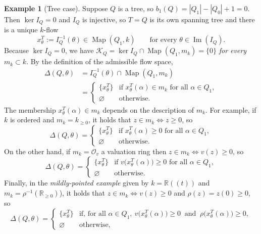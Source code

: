 \documentclass[12pt]{amsart}
\theoremstyle{plain}
\theoremstyle{definition}
\newtheorem{example}[theorem]{Example}
\DeclareMathOperator{\map}{Map}
\begin{document}
\begin{example}[Tree case]\label{tree}
Suppose $Q$ is a tree, so $b_1(Q) = |Q_1| - |Q_0| + 1 = 0$. Then $\ker I_Q = 0$
and $I_Q$ is injective, so $T = Q$ is its own spanning tree and there is a unique
$k$-flow
\[
  x^T_\theta := I_Q^{-1}(\theta) \in \map(Q_1, k)
  \qquad\text{for every } \theta \in \operatorname{Im}(I_Q).
\]
Because $\ker I_Q = 0$, we have $\mathcal{K}_Q = \ker I_Q \cap \map(Q_1,m_k) = \{0\}$
\emph{for every} $m_k \subset k$. By the definition of the admissible flow space,
\begin{align*}
  \Delta(Q,\theta)
  &= I_Q^{-1}(\theta) \cap \map(Q_1, m_k)
  \\
  & =
  \begin{cases}
    \{x^T_\theta\} & \text{if } x^T_\theta(\alpha) \in m_k \text{ for all } \alpha \in Q_1,\\[2pt]
    \varnothing    & \text{otherwise.}
  \end{cases}
\end{align*}
The membership $x^T_\theta(\alpha) \in m_k$ depends on the description of
$m_k$. For example,  if $k$ is ordered and $m_k = k_{\geq 0}$, it holds that $z \in m_k
    \iff z \geq 0$, so
    \[
      \Delta(Q,\theta) =
      \begin{cases}
        \{x^T_\theta\} & \text{if } x^T_\theta(\alpha) \geq 0 \text{ for all } \alpha \in Q_1,\\
        \varnothing    & \text{otherwise.}
      \end{cases}
    \]
On the other hand, if $m_k = \mathcal{O}_v$ a valuation ring then
    $z \in m_k \iff v(z) \geq 0$, so
    \[
      \Delta(Q,\theta) =
      \begin{cases}
        \{x^T_\theta\} & \text{if } v\big(x^T_\theta(\alpha)\big) \geq 0 \text{ for all } \alpha \in Q_1,\\
        \varnothing    & \text{otherwise.}
      \end{cases}
    \]
Finally, in the \emph{mildly-pointed example} given by $k = \mathbb{R}((t))$ and
$m_k = \rho^{-1}(\mathbb{R}_{\geq 0})$), it holds that $z \in m_k \iff v(z) \geq 0$ and $\rho(z) = z(0) \geq 0$, so
    \[
      \Delta(Q,\theta) =
      \begin{cases}
        \{x^T_\theta\} & \text{if, for all } \alpha \in Q_1,\
        v\big(x^T_\theta(\alpha)\big) \geq 0 \ \text{ and }\ \rho\big(x^T_\theta(\alpha)\big) \geq 0,\\
        \varnothing    & \text{otherwise,}
      \end{cases}
    \]
\end{example}
\end{document}
